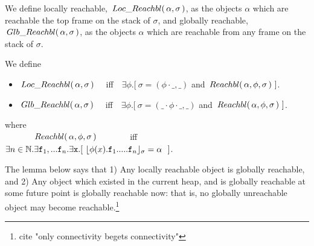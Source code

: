 We define  %
locally reachable, $ \,Loc\_Reachbl(\,\alpha,\sigma\,) $, as  the objects  $\alpha$ which are reachable the top frame on the stack of $\sigma$,
and globally reachable, $\,Glb\_Reachbl(\,\alpha,\sigma\,)$, as the objects  $\alpha$ which  are reachable from any  frame on the stack of $\sigma$.
 
\begin{definition} We define 
\begin{itemize}
\item
$ \,Loc\_Reachbl(\,\alpha,\sigma\,) $ \ \ iff\ \  
$\exists \phi.[\ \sigma=(\phi\cdot\_, \_)$ and $\Relevant \alpha \phi \sigma\ ]$. %
\item
$\,Glb\_Reachbl(\,\alpha,\sigma\,)$  \ \ iff\ \  
$\exists \phi.[\ \sigma=(\_\cdot\phi\cdot\_, \_)$ and $\Relevant \alpha \phi \sigma\ ]$. %
\end{itemize}
where\\
$\strut\ \ \ \  \ \ \ \ \ \ \,Reachbl(\,\alpha,\phi,\sigma\,) $  \ \ \ \ \ \ \ iff\ \  
$\exists n\in \mathbb{N}.\exists \prg{f}_1,... \prg{f}_n.\exists \prg{x}.[ \ \interpret{\sigma}{\phi(x).\prg{f}_1.....\prg{f}_n} = \alpha \ \ ]$.

\end{definition}


The lemma below says that 1) Any locally reachable object is globally reachable, and 
2) Any object which existed in the current  heap, and is globally reachable at some future point is globally reachable now: that is, 
no globally unreachable object may become reachable.\footnote{cite "only connectivity begets connectivity"}


 
